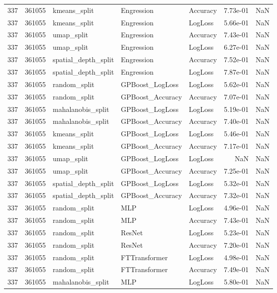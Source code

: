\begin{tabular}{rrlllrr}
337 & 361055 & kmeans\_split & Engression & Accuracy & 7.73e-01 & NaN \\
337 & 361055 & kmeans\_split & Engression & LogLoss & 5.66e-01 & NaN \\
337 & 361055 & umap\_split & Engression & Accuracy & 7.43e-01 & NaN \\
337 & 361055 & umap\_split & Engression & LogLoss & 6.27e-01 & NaN \\
337 & 361055 & spatial\_depth\_split & Engression & Accuracy & 7.52e-01 & NaN \\
337 & 361055 & spatial\_depth\_split & Engression & LogLoss & 7.87e-01 & NaN \\
337 & 361055 & random\_split & GPBoost\_LogLoss & LogLoss & 5.62e-01 & NaN \\
337 & 361055 & random\_split & GPBoost\_Accuracy & Accuracy & 7.07e-01 & NaN \\
337 & 361055 & mahalanobis\_split & GPBoost\_LogLoss & LogLoss & 5.19e-01 & NaN \\
337 & 361055 & mahalanobis\_split & GPBoost\_Accuracy & Accuracy & 7.40e-01 & NaN \\
337 & 361055 & kmeans\_split & GPBoost\_LogLoss & LogLoss & 5.46e-01 & NaN \\
337 & 361055 & kmeans\_split & GPBoost\_Accuracy & Accuracy & 7.17e-01 & NaN \\
337 & 361055 & umap\_split & GPBoost\_LogLoss & LogLoss & NaN & NaN \\
337 & 361055 & umap\_split & GPBoost\_Accuracy & Accuracy & 7.25e-01 & NaN \\
337 & 361055 & spatial\_depth\_split & GPBoost\_LogLoss & LogLoss & 5.32e-01 & NaN \\
337 & 361055 & spatial\_depth\_split & GPBoost\_Accuracy & Accuracy & 7.32e-01 & NaN \\
337 & 361055 & random\_split & MLP & LogLoss & 4.96e-01 & NaN \\
337 & 361055 & random\_split & MLP & Accuracy & 7.43e-01 & NaN \\
337 & 361055 & random\_split & ResNet & LogLoss & 5.23e-01 & NaN \\
337 & 361055 & random\_split & ResNet & Accuracy & 7.20e-01 & NaN \\
337 & 361055 & random\_split & FTTransformer & LogLoss & 4.98e-01 & NaN \\
337 & 361055 & random\_split & FTTransformer & Accuracy & 7.49e-01 & NaN \\
337 & 361055 & mahalanobis\_split & MLP & LogLoss & 5.80e-01 & NaN \\

\end{tabular}
